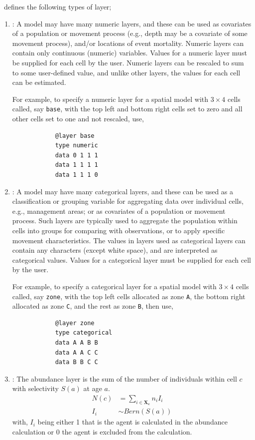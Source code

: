 \IBM\ defines the following types of layer;

\begin{enumerate}
	\item{\label{numeric-layer}}: A model may have many numeric layers, and these can be used as covariates of a population or movement process (e.g., depth may be a covariate of some movement process), and/or locations of event mortality. Numeric layers can contain only continuous (numeric) variables. Values for a numeric layer must be supplied for each cell by the user. Numeric layers can be rescaled to sum to some user-defined value, and unlike other layers, the values for each cell can be estimated. 
	
	For example, to specify a numeric layer for a spatial model with $3 \times 4$ cells called, say \texttt{base}, with the top left and bottom right cells set to zero and all other cells set to one and not rescaled, use,
	{\small{\begin{verbatim}
			@layer base
			type numeric
			data 0 1 1 1
			data 1 1 1 1
			data 1 1 1 0
			\end{verbatim}}}
	
	\item {\label{categorical-layer}}: A model may have many categorical layers, and these can be used as a classification or grouping variable for aggregating data over individual cells, e.g., management areas; or as covariates of a population or movement process. Such layers are typically used to aggregate the population within cells into groups for comparing with observations, or to apply specific movement characteristics. The values in layers used as categorical layers can contain any characters (except white space), and are interpreted as categorical values. Values for a categorical layer must be supplied for each cell by the user.
	
	For example, to specify a categorical layer for a spatial model with $3 \times 4$ cells called, say \texttt{zone}, with the top left cells allocated as zone \texttt{A}, the bottom right allocated as zone \texttt{C}, and the rest as zone \texttt{B}, then use,
	{\small{\begin{verbatim}
			@layer zone
			type categorical
			data A A B B
			data A A C C
			data B B C C
			\end{verbatim}}}
	
	
	\item{}: The abundance layer is the sum of the number of individuals within cell $c$ with selectivity $S(a)$ at age $a$. 
	\begin{align}
	N(c) &= \sum\limits_{i \in \bm{X_c}} n_i I_i\\
	I_i &\sim Bern(S(a))
	\end{align}
	with, \(I_i\) being either 1 that is the agent is calculated in the abundance calculation or 0 the agent is excluded from the calculation.
	

\end{enumerate}
